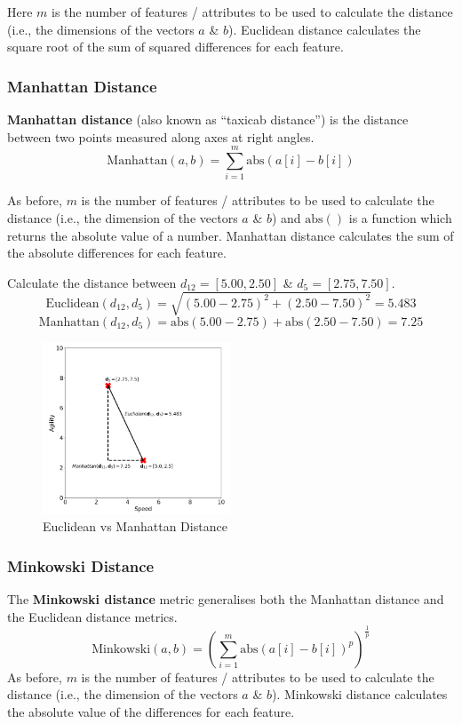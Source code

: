 \documentclass[a4paper,11pt]{article}
\begin{document}
Here $m$ is the number of features / attributes to be used to calculate the distance (i.e., the dimensions of the vectors $a$ \& $b$).
Euclidean distance calculates the square root of the sum of squared differences for each feature.

\subsubsection{Manhattan Distance}
\textbf{Manhattan distance} (also known as ``taxicab distance'') is the distance between two points measured along axes at
right angles.
$$
\text{Manhattan}(a,b) = \sum^m_{i=1}\text{abs}(a[i] - b[i])
$$

As before, $m$ is the number of features / attributes to be used to calculate the distance (i.e., the dimension of the vectors $a$ \& $b$) and $\text{abs}()$ is a function which returns the absolute value of a number.
Manhattan distance calculates the sum of the absolute differences for each feature.

\begin{tcolorbox}[colback=gray!10, colframe=black, title=\textbf{Example: Calculating Distance}]
    Calculate the distance between $d_{12} = [5.00, 2.50]$ \& $d_5 = [2.75, 7.50]$.
    $$
    \text{Euclidean}(d_{12}, d_5) = \sqrt{(5.00 - 2.75)^2 + (2.50 - 7.50)^2} = 5.483
    $$
    $$
    \text{Manhattan}(d_{12}, d_5) = \text{abs}(5.00 - 2.75) + \text{abs}(2.50 - 7.50) = 7.25
    $$

    \begin{figure}[H]
        \centering
        \includegraphics[width=0.5\textwidth]{./images/calc_distance_example.png}
        \caption{Euclidean vs Manhattan Distance}
    \end{figure}
\end{tcolorbox}

\subsubsection{Minkowski Distance}
The \textbf{Minkowski distance} metric generalises both the Manhattan distance and the Euclidean distance metrics.
$$
\text{Minkowski}(a,b) = \left( \sum^m_{i=1} \text{abs}(a[i] - b[i])^p \right)^{\frac{1}{p}}
$$
As before, $m$ is the number of features / attributes to be used to calculate the distance (i.e., the dimension of the vectors $a$ \& $b$).
Minkowski distance calculates the absolute value of the differences for each feature.
\end{document}
